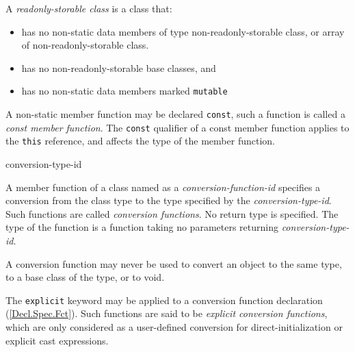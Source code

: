 \p A \textit{readonly-storable class} is a class that:

\begin{itemize}
  \item has no non-static data members of type non-readonly-storable class, or array of non-readonly-storable class.
  \item has no non-readonly-storable base classes, and
  \item has no non-static data members marked \texttt{mutable}
\end{itemize}




\p A non-static member function may be declared \texttt{const}, such a function
is called a \textit{const member function}. The \texttt{const} qualifier of a
const member function applies to the \texttt{this} reference, and affects the
type of the member function.


\begin{grammar}
  \br
   conversion-type-id\br
\end{grammar}

\p A member function of a class named as a \textit{conversion-function-id}
specifies a conversion from the class type to the type specified by the
\textit{conversion-type-id}. Such functions are called \textit{conversion
functions}. No return type is specified. The type of the function is a function
taking no parameters returning \textit{conversion-type-id}.

\p A conversion function may never be used to convert an object to the same
type, to a base class of the type, or to void.

\p The \texttt{explicit} keyword may be applied to a conversion function
declaration (\ref{Decl.Spec.Fct}). Such functions are said to be
\textit{explicit conversion functions}, which are only considered as a
user-defined conversion for direct-initialization or explicit cast expressions.

